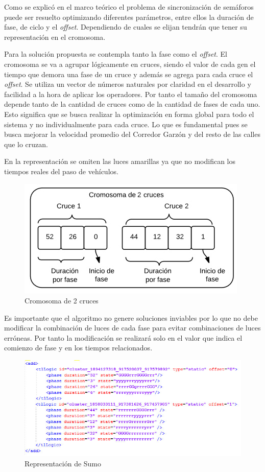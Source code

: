 Como se explicó en el marco teórico el problema de sincronización de semáforos puede ser resuelto optimizando diferentes parámetros, entre ellos la duración de fase, de ciclo y el \emph{offset}. Dependiendo de cuales se elijan tendrán que tener su representación en el cromosoma.

Para la solución propuesta se contempla tanto la fase como el \emph{offset}. El cromosoma se va a  agrupar  lógicamente en cruces, siendo el valor de cada gen el tiempo que demora una
fase de un cruce y además se agrega para cada cruce el \emph{offset}. Se utiliza un vector de números naturales por claridad en el desarrollo y facilidad a la hora de aplicar los operadores.
Por tanto el tamaño del cromosoma depende tanto de la cantidad de cruces como de la cantidad de fases de cada uno. Esto significa que se busca realizar la optimización en forma global para todo el sistema y no individualmente para cada cruce. Lo que es fundamental pues se busca mejorar la velocidad promedio del Corredor Garzón y del resto de las calles que lo cruzan.

En la representación se omiten las luces amarillas ya que no modifican los tiempos reales del paso de vehículos.
 
 \begin{figure}[h]
 	\centering
 	\includegraphics[width=0.7\linewidth]{Figures/cromosoma1}
 	\caption{Cromosoma de 2 cruces}
 	\label{fig:cromosoma1}
 \end{figure}
 
Es  importante que el algoritmo no genere soluciones inviables por lo que no debe modificar la combinación de luces de cada fase para evitar combinaciones de luces erróneas. Por tanto la modificación se realizará solo en el valor que indica el comienzo de fase y en los tiempos relacionados.

\begin{figure}[H]
	\centering
	\includegraphics[width=\linewidth]{Figures/rep_sumo2}
	\caption{Representación de Sumo}
	\label{fig:rep_sumo}
\end{figure}

